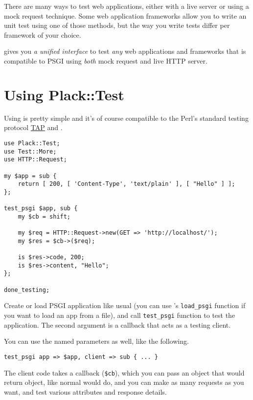 There are many ways to test web applications, either with a live server
or using a mock request technique. Some web application frameworks allow
you to write an unit test using one of those methods, but the way you
write tests differ per framework of your choice.

 gives you \emph{a unified interface} to test \emph{any} web
applications and frameworks that is compatible to PSGI using \emph{both}
mock request and live HTTP server.

\section{Using Plack::Test}\label{using-placktest}

Using  is pretty simple and it's of course compatible to the
Perl's standard testing protocol
\href{http://testanything.org/wiki/}{TAP} and
\href{http://search.cpan.org/perldoc?Test::More}{}.

\begin{lstlisting}
use Plack::Test;
use Test::More;
use HTTP::Request;

my $app = sub {
    return [ 200, [ 'Content-Type', 'text/plain' ], [ "Hello" ] ];
};

test_psgi $app, sub {
    my $cb = shift;
    
    my $req = HTTP::Request->new(GET => 'http://localhost/');
    my $res = $cb->($req);
    
    is $res->code, 200;
    is $res->content, "Hello";
};

done_testing;
\end{lstlisting}

Create or load PSGI application like usual (you can use
\href{http://search.cpan.org/perldoc?Plack::Util}{}'s
\lstinline!load_psgi! function if you want to load an app from a
 file), and call \lstinline!test_psgi! function to test
the application. The second argument is a callback that acts as a
testing client.

You can use the named parameters as well, like the following.

\begin{lstlisting}
test_psgi app => $app, client => sub { ... }
\end{lstlisting}

The client code takes a callback (\lstinline!$cb!), which you can pass
an  object that would return  object, like
normal  would do, and you can make as many requests as you
want, and test various attributes and response details.

